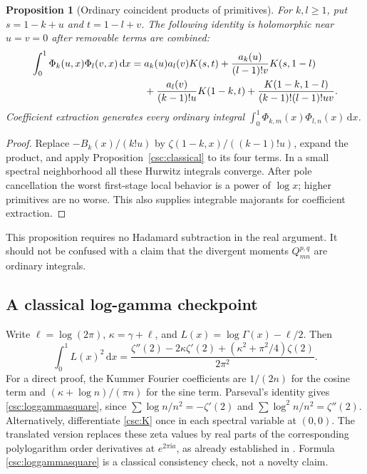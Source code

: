\documentclass[11pt,a4paper]{article}
\numberwithin{equation}{section}
\newtheorem{proposition}[theorem]{Proposition}
\theoremstyle{definition}
\newcommand{\dd}{\,\mathrm dx}
\newcommand{\ii}{\mathrm i}
\begin{document}
\begin{proposition}[Ordinary coincident products of primitives]\label{csc:primitiveproducts}
For $k,l\ge1$, put $s=1-k+u$ and $t=1-l+v$. The following identity is holomorphic near $u=v=0$ after removable terms are combined:
\begin{align}
\int_0^1\Phi_k(u,x)\Phi_l(v,x)\dd
={}&a_k(u)a_l(v)K(s,t)
+\frac{a_k(u)}{(l-1)!v}K(s,1-l)\notag\\
&+\frac{a_l(v)}{(k-1)!u}K(1-k,t)
+\frac{K(1-k,1-l)}{(k-1)!(l-1)!uv}.\label{csc:primitiveproduct}
\end{align}
Coefficient extraction generates every ordinary integral
$\int_0^1\Phi_{k,m}(x)\Phi_{l,n}(x)\dd$.
\end{proposition}
\begin{proof}
Replace $-B_k(x)/(k!u)$ by $\zeta(1-k,x)/((k-1)!u)$, expand the product, and apply Proposition~\ref{csc:classical} to its four terms. In a small spectral neighborhood all these Hurwitz integrals converge. After pole cancellation the worst first-stage local behavior is a power of $\log x$; higher primitives are no worse. This also supplies integrable majorants for coefficient extraction.
\end{proof}
This proposition requires no Hadamard subtraction in the real argument. It should not be confused with a claim that the divergent moments $Q_{mn}^{p,q}$ are ordinary integrals.

\subsection{A classical log-gamma checkpoint}
Write $\ell=\log(2\pi)$, $\kappa=\gamma+\ell$, and
$L(x)=\log\Gamma(x)-\ell/2$. Then
\begin{equation}\label{csc:loggammasquare}
\int_0^1L(x)^2\dd
=\frac{\zeta''(2)-2\kappa\zeta'(2)+(\kappa^2+\pi^2/4)\zeta(2)}{2\pi^2}.
\end{equation}
For a direct proof, the Kummer Fourier coefficients are
$1/(2n)$ for the cosine term and $(\kappa+\log n)/(\pi n)$ for the sine term. Parseval's identity gives \eqref{csc:loggammasquare}, since
$\sum\log n/n^2=-\zeta'(2)$ and $\sum\log^2 n/n^2=\zeta''(2)$.
Alternatively, differentiate \eqref{csc:K} once in each spectral variable at $(0,0)$. The translated version replaces these zeta values by real parts of the corresponding polylogarithm order derivatives at $e^{2\pi\ii a}$, as already established in \cite{csc:shifted}. Formula \eqref{csc:loggammasquare} is a classical consistency check, not a novelty claim.
\end{document}
